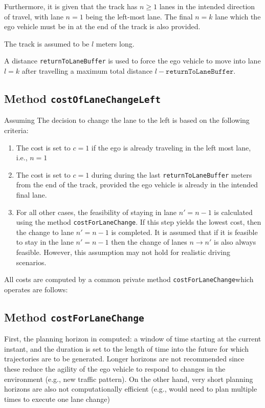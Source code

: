 \documentclass{article}
\begin{document}
Furthermore, it is given that the track has $ n \geq 1$ lanes in the intended direction of travel, with lane $ n = 1 $ being the left-most lane.
The final $ n = k $ lane which the ego vehicle must be in at the end of the track is also provided.

The track is assumed to be $ l $ meters long.

A distance \texttt{returnToLaneBuffer} is used to force the ego vehicle to move into lane $ l = k $ after travelling a maximum total distance $ l -  \texttt{returnToLaneBuffer}$.

\subsection{Method \texttt{costOfLaneChangeLeft}}
Assuming
The decision to change the lane to the left is based on the following criteria:
\begin{enumerate}
\item The cost is set to $ c = 1 $ if the ego is already traveling in the  left most lane, i.e., $ n = 1 $
\item The cost is set to $ c = 1 $ during during the last \texttt{returnToLaneBuffer} meters from the end of the track, provided the ego vehicle is already in the intended final lane.
\item For all other cases, the feasibility of staying in lane $ n' = n - 1 $ is calculated using the method \texttt{costForLaneChange}. If this step yields the lowest cost, then the change to lane $ n' = n - 1 $ is completed. It is assumed that if it is feasible to stay in the lane $ n' = n -1 $ then the change of lanes $ n \rightarrow n' $ is also always feasible. However, this assumption may not hold for realistic driving scenarios.
\end{enumerate}

All costs are computed by a common private method \texttt{costForLaneChange}which operates are follows:
\subsection{Method \texttt{costForLaneChange}}
First, the planning horizon in computed: a window of time starting at the current instant, and the duration is set to the length of time into the future for which trajectories are to be generated. Longer horizons are not recommended since these reduce the agility of the ego vehicle to respond to changes in the environment (e.g., new traffic pattern). On the other hand, very short planning horizons are also not computationally efficient (e.g., would need to plan multiple times to execute one lane change)
\end{document}
